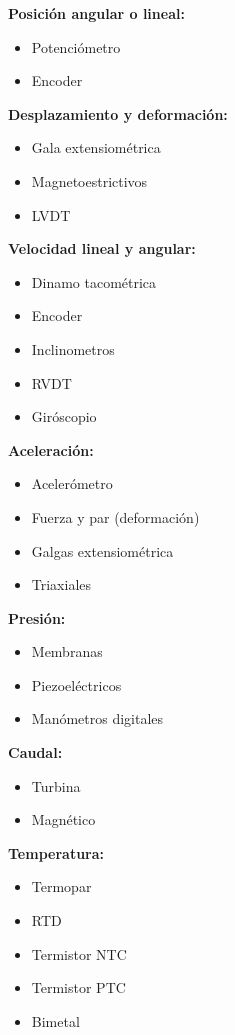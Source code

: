 \textbf{Posición angular o lineal:}
\begin{itemize}
 \item Potenciómetro
 \item Encoder
\end{itemize}

\textbf{Desplazamiento y deformación:}
\begin{itemize}
 \item Gala extensiométrica
 \item Magnetoestrictivos
 \item LVDT
\end{itemize}

\textbf{Velocidad lineal y angular:}
\begin{itemize}
  \item     Dinamo tacométrica
  \item     Encoder
  \item     Inclinometros
  \item     RVDT
  \item     Giróscopio
\end{itemize}

\textbf{Aceleración:}
\begin{itemize}
  \item     Acelerómetro
  \item     Fuerza y par (deformación)
  \item     Galgas extensiométrica
  \item     Triaxiales
\end{itemize}

\textbf{Presión:}
\begin{itemize}
  \item     Membranas
  \item     Piezoeléctricos
  \item     Manómetros digitales
\end{itemize}

\textbf{Caudal:}
\begin{itemize}
  \item     Turbina
  \item     Magnético
\end{itemize}

\textbf{Temperatura:}
\begin{itemize}
  \item     Termopar
  \item     RTD
  \item     Termistor NTC
  \item     Termistor PTC
  \item     Bimetal
\end{itemize}

